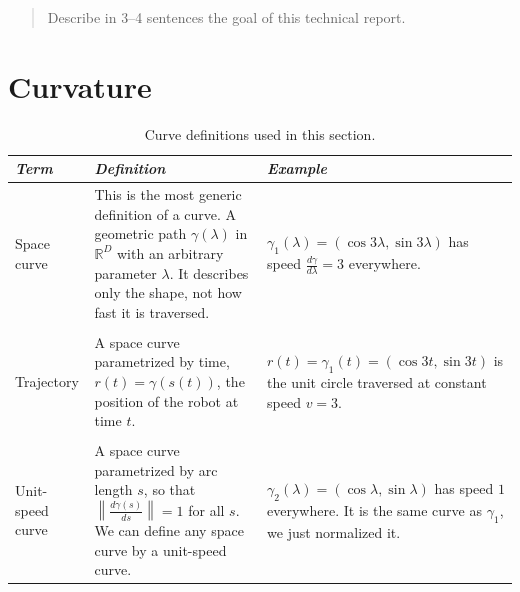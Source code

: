 \documentclass[12pt,letterpaper,oneside]{article}
\begin{document}
\makeCustomTitle
\thispagestyle{titlePage}

\begin{abstract}
  Describe in 3--4 sentences the goal of this technical report.
  \lightlipsum[1]
\end{abstract}

\section{Curvature}

\begin{table}[htbp]
  \centering
  \caption{Curve definitions used in this section.}
  \label{tab:curveDefinitions}
  \begin{tabu}{lXX}

    \toprule
    \emph{Term} & \emph{Definition} & \emph{Example} \\
    \midrule

    Space curve
    &
    This is the most generic definition of a curve.
    A geometric path $\gamma(\lambda)$ in $\mathbb{R}^D$ with an arbitrary parameter $\lambda$.
    It describes only the shape, not how fast it is traversed.
    &
    $\gamma_1(\lambda) = (\cos 3\lambda, \sin 3\lambda)$ has speed $\frac{d\gamma}{d\lambda} = 3$ everywhere. \\\\
    Trajectory
    &
    A space curve parametrized by time, $r(t) = \gamma(s(t))$, the position of the robot at time $t$.
    &
    $r(t) = \gamma_1(t) = (\cos 3t, \sin 3t)$ is the unit circle traversed at constant speed $v = 3$. \\\\
    Unit-speed curve
    &
    A space curve parametrized by arc length $s$, so that $\left\| \frac{d\gamma(s)}{ds} \right\| = 1$ for all $s$.
    We can define any space curve by a unit-speed curve.
    &
    $\gamma_2(\lambda) = (\cos \lambda, \sin \lambda)$ has speed $1$ everywhere.
    It is the same curve as $\gamma_1$, we just normalized it. \\

    \bottomrule

  \end{tabu}
\end{table}
\end{document}
